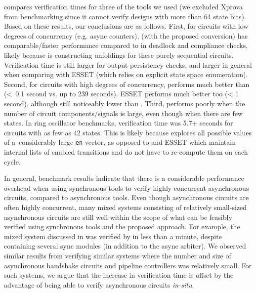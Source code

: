  compares verification times for three of the tools we
used (we excluded Xprova from benchmarking since it cannot verify designs with
more than 64 state bits). Based on these results, our conclusions are as
follows. First, for circuits with low degrees of concurrency (e.g. async
counters), \ind{} (with the proposed conversion) has comparable/faster
performance compared to \mpsat{} in deadlock and compliance checks, likely
because \mpsat{} is constructing unfoldings for these purely sequential
circuits. Verification time is still larger for output persistency checks, and
larger in general when comparing with ESSET (which relies on explicit state
space enumeration). Second, for circuits with high degrees of concurrency,
\mpsat{} performs much better than \ind{} (<~0.1 second vs. up to 239
seconds). ESSET performs much better too (< 1 second), although still
noticeably lower than \mpsat{}. Third, \ind{} performs poorly when the number
of circuit components/signals is large, even though when there are few states.
In ring oscillator benchmarks, verification time was 5.7+ seconds for circuits
with as few as 42 states. This is likely because \ind{} explores all possible
values of a~considerably large \texttt{en} vector, as opposed to \mpsat{} and
ESSET which maintain internal lists of enabled transitions and do not have to
re-compute them on each cycle.

In general, benchmark results indicate that there is a considerable
performance overhead when using synchronous tools to verify highly concurrent
asynchronous circuits, compared to asynchronous tools. Even though
asynchronous circuits are often highly concurrent, many mixed systems
consisting of relatively small-sized asynchronous circuits are still well
within the scope of what can be feasibly verified using synchronous tools and
the proposed approach. For example, the mixed system discussed in
 was verified by \ind{} in less than a minute, despite
containing several sync modules (in addition to the async arbiter). We
observed similar results from verifying similar systems
\cite{sokolov2015design} where the number and size of asynchronous handshake
circuits and pipeline controllers was relatively small. For such systems, we
argue that the increase in verification time is offset by the advantage of
being able to verify asynchronous circuits \emph{in-situ}.




